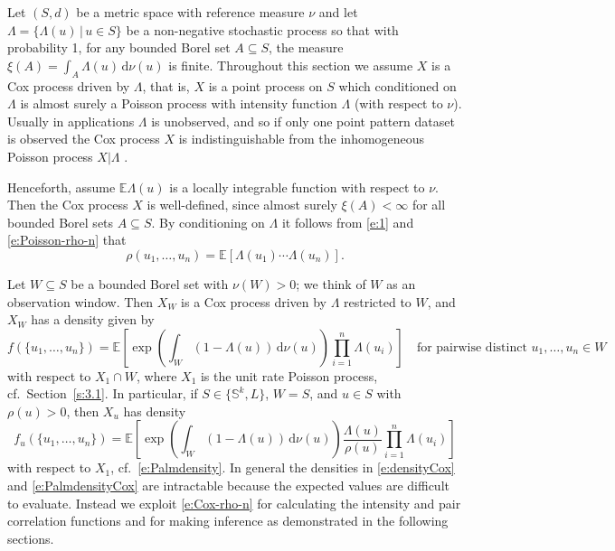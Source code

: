 \documentclass[alpha-refs]{wiley-article}
\begin{document}
Let $(S,d)$ be a metric space with reference measure $\nu$ %
and 
let $\Lambda=\{\Lambda(u)\,|\,u\in S\}$ be a non-negative stochastic process so that with probability 1, for any bounded Borel set $A\subseteq S$,  the measure $\xi(A)=\int_A\Lambda(u)\,\mathrm d\nu(u)$ is finite. Throughout this section we assume $X$ is a Cox process driven by $\Lambda$, that is, $X$ is a point process on $S$ which conditioned on $\Lambda$ is almost surely a Poisson process with intensity function $\Lambda$ (with respect to $\nu$). 
Usually in applications $\Lambda$ is unobserved, and so if only one point pattern dataset is observed the Cox process $X$ is indistinguishable from the inhomogeneous Poisson process $X|\Lambda$  \citep[for a discussion of which of the two models is most appropriate, see][Section 5.1]{MW04}. 

Henceforth, assume $\mathbb E\Lambda(u)$ is a locally integrable function with respect to $\nu$. Then the Cox process $X$ is well-defined, since almost surely $\xi(A)<\infty$ for all bounded Borel sets $A\subseteq S$. %
By conditioning on $\Lambda$ it follows from \eqref{e:1} and \eqref{e:Poisson-rho-n} that
\begin{equation}\label{e:Cox-rho-n}
\rho(u_1,\ldots,u_n)=\mathbb E\left[\Lambda(u_1)\cdots\Lambda(u_n)\right].
\end{equation}

Let $W\subseteq S$ be a bounded Borel set with $\nu(W)>0$; we think of $W$ as an observation window. Then  $X_W$ is a Cox process driven by $\Lambda$ restricted to $W$, and $X_W$ has a density given by
\begin{equation}\label{e:densityCox}
f(\{u_1,\ldots,u_n\})=\mathbb E\left[\exp\left(\int_W (1- \Lambda(u))\,\mathrm d\nu(u)\right)\prod_{i=1}^n\Lambda(u_i)\right]\quad\mbox{for pairwise distinct }u_1,\ldots,u_n\in W
\end{equation}
with respect to $X_1\cap W$, where $X_1$ is the unit rate Poisson process, cf.\ Section~\ref{s:3.1}.
In particular, if $S\in\{\mathbb S^k,L\}$, $W=S$, and $u\in S$ with $\rho(u)>0$, then $X_u$ has density
\begin{equation}\label{e:PalmdensityCox} 
f_u(\{u_1,\ldots,u_n\})=\mathbb E\left[\exp\left(\int_W (1- \Lambda(u))\,\mathrm d\nu(u)\right)\frac{\Lambda(u)}{\rho(u)}\prod_{i=1}^n\Lambda(u_i)\right]
\end{equation}
with respect to $X_1$, cf.\ \eqref{e:Palmdensity}.
In general the densities in \eqref{e:densityCox} and \eqref{e:PalmdensityCox} are intractable because the expected values are difficult to evaluate. Instead we  
exploit \eqref{e:Cox-rho-n} for calculating the intensity and pair correlation functions and for making inference as demonstrated in the following sections. 
\end{document}
